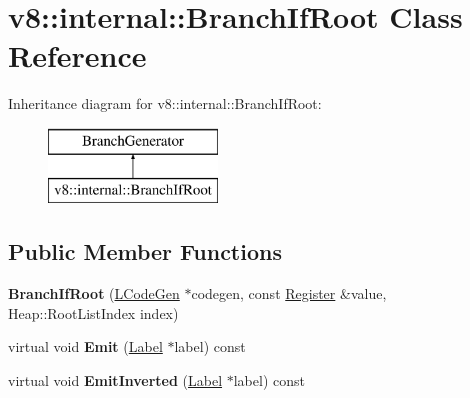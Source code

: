 \hypertarget{classv8_1_1internal_1_1_branch_if_root}{}\section{v8\+:\+:internal\+:\+:Branch\+If\+Root Class Reference}
\label{classv8_1_1internal_1_1_branch_if_root}
Inheritance diagram for v8\+:\+:internal\+:\+:Branch\+If\+Root\+:\begin{figure}[H]
\begin{center}
\leavevmode
\includegraphics[height=2.000000cm]{classv8_1_1internal_1_1_branch_if_root}
\end{center}
\end{figure}
\subsection*{Public Member Functions}
\begin{DoxyCompactItemize}
\item 
{\bfseries Branch\+If\+Root} (\hyperlink{classv8_1_1internal_1_1_l_code_gen}{L\+Code\+Gen} $\ast$codegen, const \hyperlink{structv8_1_1internal_1_1_register}{Register} \&value, Heap\+::\+Root\+List\+Index index)\hypertarget{classv8_1_1internal_1_1_branch_if_root_afb116ecc8f1754da1bba7c471ca86c5d}{}\label{classv8_1_1internal_1_1_branch_if_root_afb116ecc8f1754da1bba7c471ca86c5d}

\item 
virtual void {\bfseries Emit} (\hyperlink{classv8_1_1internal_1_1_label}{Label} $\ast$label) const \hypertarget{classv8_1_1internal_1_1_branch_if_root_ac5150f43357b525725f6cf9ad03be79e}{}\label{classv8_1_1internal_1_1_branch_if_root_ac5150f43357b525725f6cf9ad03be79e}

\item 
virtual void {\bfseries Emit\+Inverted} (\hyperlink{classv8_1_1internal_1_1_label}{Label} $\ast$label) const \hypertarget{classv8_1_1internal_1_1_branch_if_root_aaf3650ddbaa74f1cb5fac13338bf531a}{}\label{classv8_1_1internal_1_1_branch_if_root_aaf3650ddbaa74f1cb5fac13338bf531a}

\end{DoxyCompactItemize}
